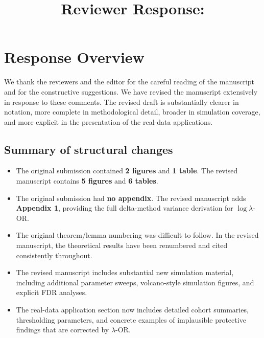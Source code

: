 \documentclass[onecolumn,11pt]{IEEEtran}
\title{Reviewer Response: \TITLE}
\begin{document}
\maketitle

\newcommand{\revcommnt}[1]{%
\par\medskip\noindent{\color{MediumBlue}\colorbox{black}{\color{yellow}\bf Reviewer comment:} \bf #1}\par\smallskip\noindent\textbf{Author response. }%
}

\section*{Response Overview}

We thank the reviewers and the editor for the careful reading of the manuscript and for the constructive suggestions. We have revised the manuscript extensively in response to these comments. The revised draft is substantially clearer in notation, more complete in methodological detail, broader in simulation coverage, and more explicit in the presentation of the real-data applications.

\subsection*{Summary of structural changes} 

\begin{itemize}
\item The original submission contained \textbf{2 figures} and \textbf{1 table}. The revised manuscript contains \textbf{5 figures} and \textbf{6 tables}.
\item The original submission had \textbf{no appendix}. The revised manuscript adds \textbf{Appendix 1}, providing the full delta-method variance derivation for $\log \lambda$-OR.
\item The original theorem/lemma numbering was difficult to follow. In the revised manuscript, the theoretical results have been renumbered and cited consistently throughout.
\item The revised manuscript includes substantial new simulation material, including additional parameter sweeps, volcano-style simulation figures, and explicit FDR analyses.
\item The real-data application section now includes detailed cohort summaries, thresholding parameters, and concrete examples of implausible protective findings that are corrected by $\lambda$-OR.
\end{itemize}
\end{document}
